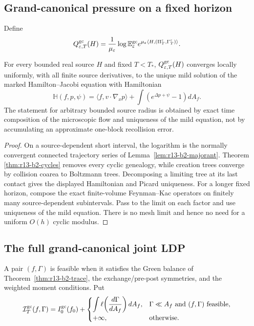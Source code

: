 \subsection{Grand-canonical pressure on a fixed horizon}

Define
\[
 Q_{\varepsilon,T}^{\rm gc}(H)
 ={1\over\mu_\varepsilon}
 \log\mathbb E_\varepsilon^{\rm gc}
 e^{\mu_\varepsilon\langle H,
      (\Pi_T^\varepsilon,\Gamma_T^\varepsilon)\rangle}.
\]

\begin{theorem}
\label{thm:r13-b2-pressure}
For every bounded real source $H$ and fixed $T<T_*$,
$Q_{\varepsilon,T}^{\rm gc}(H)$ converges locally uniformly, with all finite
source derivatives, to the unique mild solution of the marked
Hamilton--Jacobi equation with Hamiltonian
\[
 \mathbb H(f,p,\psi)
 =\langle f,v\cdot\nabla_xp\rangle
 +\int\left(e^{\Delta p+\psi}-1\right)dA_f.
\]
The statement for arbitrary bounded source radius is obtained by exact time
composition of the microscopic flow and uniqueness of the mild equation, not
by accumulating an approximate one-block recollision error.
\end{theorem}

\begin{proof}
On a source-dependent short interval, the logarithm is the normally convergent
connected trajectory series of Lemma~\ref{lem:r13-b2-majorant}.  Theorem
\ref{thm:r13-b2-cycles} removes every cyclic genealogy, while creation trees
converge by collision coarea to Boltzmann trees.  Decomposing a limiting tree
at its last contact gives the displayed Hamiltonian and Picard uniqueness.
For a longer fixed horizon, compose the exact finite-volume Feynman--Kac
operators on finitely many source-dependent subintervals.  Pass to the limit
on each factor and use uniqueness of the mild equation.  There is no mesh
limit and hence no need for a uniform $O(h)$ cyclic modulus.
\end{proof}

\subsection{The full grand-canonical joint LDP}

A pair $(f,\Gamma)$ is feasible when it satisfies the Green balance of
Theorem~\ref{thm:r13-b2-trace}, the exchange/pre-post symmetries, and the
weighted moment conditions.  Put
\[
 \mathcal I_T^{\rm gc}(f,\Gamma)
 =I_0^{\rm gc}(f_0)+
 \begin{cases}
 \displaystyle\int\ell\!
  \left({d\Gamma\over dA_f}\right)dA_f,
 &\Gamma\ll A_f\text{ and }(f,\Gamma)\text{ feasible},\\[2mm]
 +\infty,&\text{otherwise}.
 \end{cases}
\]

